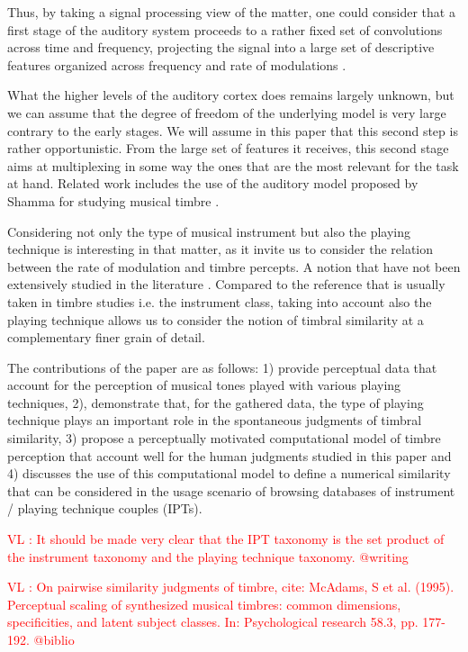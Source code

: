 \documentclass{article}
\makeatletter
\newcommand*{\ie}{i.e.\@\xspace}
\newcommand{\ipts}{IPTs\xspace}
\newcommand{\vl}[1]{\textcolor{red}{VL : #1}}
\makeatother
\begin{document}
Thus, by taking a signal processing view of the matter, one could consider that a first stage of the auditory system proceeds to a rather fixed set of convolutions across time and frequency, projecting the signal into a large set of descriptive features organized across frequency and rate of modulations \cite{anden2014deep}.

What the higher levels of the auditory cortex does remains largely unknown, but we can assume that the degree of freedom of the underlying model is very large contrary to the early stages.  We will assume in this paper that this second step is rather opportunistic. From the large set of features it receives, this second stage aims at multiplexing in some way the ones that are the most relevant for the task at hand. Related work includes the use of the auditory model proposed by Shamma for studying musical timbre \cite{patil2012music}.

Considering not only the type of musical instrument but also the playing technique is interesting in that matter, as it invite us to consider the relation between the rate of modulation and timbre percepts. A notion that have not been extensively studied in the literature \cite{burred2010dynamic}. Compared to the reference that is usually taken in timbre studies \ie{} the instrument class, taking into account also the playing technique allows us to consider the notion of timbral similarity at a complementary finer grain of detail.

The contributions of the paper are as follows:
1) provide perceptual data that account for the perception of musical tones played with various playing techniques, 2), demonstrate that, for the gathered data, the type of playing technique plays an important role in the spontaneous judgments of timbral similarity, 3) propose a perceptually motivated computational model of timbre perception that account well for the human judgments studied in this paper and 4) discusses the use of this computational model to define a numerical similarity that can be considered in the usage scenario of browsing databases of instrument / playing technique couples (\ipts).

\vl{It should be made very clear that the IPT taxonomy is
the set product of the instrument taxonomy
and the playing technique taxonomy. @writing}

\vl{On pairwise similarity judgments of timbre, cite:
McAdams, S et al. (1995). Perceptual scaling of synthesized musical
timbres: common dimensions, specificities, and latent subject
classes. In: Psychological research 58.3, pp. 177-192.
@biblio}
\end{document}
